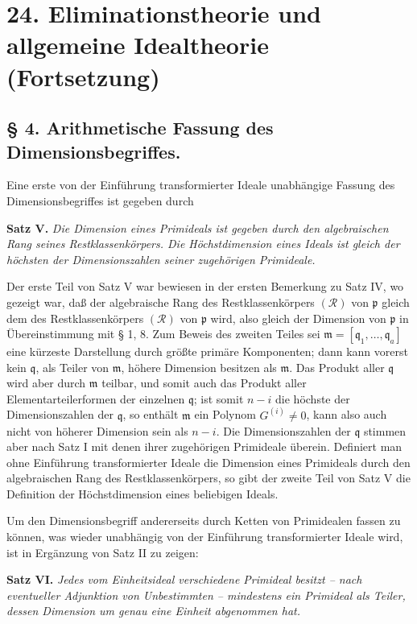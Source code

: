 \documentclass[11pt]{article}
\providecommand{\frakm}{\mathfrak m}
\providecommand{\frakp}{\mathfrak p}
\providecommand{\frakq}{\mathfrak q}
\begin{document}
\section*{24. Eliminationstheorie und allgemeine Idealtheorie (Fortsetzung)}

\subsection*{§ 4. Arithmetische Fassung des Dimensionsbegriffes.}

Eine erste von der Einführung transformierter Ideale unabhängige Fassung des Dimensionsbegriffes ist gegeben durch

\textbf{Satz V.} \emph{Die Dimension eines Primideals ist gegeben durch den algebraischen Rang seines Restklassenkörpers. Die Höchstdimension eines Ideals ist gleich der höchsten der Dimensionszahlen seiner zugehörigen Primideale.}

Der erste Teil von Satz V war bewiesen in der ersten Bemerkung zu Satz IV, wo gezeigt war, daß der algebraische Rang des Restklassenkörpers $(\mathcal R)$ von $\frakp$ gleich dem des Restklassenkörpers $(\mathcal R)$ von $\frakp$ wird, also gleich der Dimension von $\frakp$ in Übereinstimmung mit § 1, 8. Zum Beweis des zweiten Teiles sei $\frakm=[\frakq_1,\ldots,\frakq_a]$ eine kürzeste Darstellung durch größte primäre Komponenten; dann kann vorerst kein $\frakq$, als Teiler von $\frakm$, höhere Dimension besitzen als $\frakm$. Das Produkt aller $\frakq$ wird aber durch $\frakm$ teilbar, und somit auch das Produkt aller Elementarteilerformen der einzelnen $\frakq$; ist somit $n-i$ die höchste der Dimensionszahlen der $\frakq$, so enthält $\frakm$ ein Polynom $G^{(i)}\ne0$, kann also auch nicht von höherer Dimension sein als $n-i$. Die Dimensionszahlen der $\frakq$ stimmen aber nach Satz I mit denen ihrer zugehörigen Primideale überein. Definiert man ohne Einführung transformierter Ideale die Dimension eines Primideals durch den algebraischen Rang des Restklassenkörpers, so gibt der zweite Teil von Satz V die Definition der Höchstdimension eines beliebigen Ideals.

Um den Dimensionsbegriff andererseits durch Ketten von Primidealen fassen zu können, was wieder unabhängig von der Einführung transformierter Ideale wird, ist in Ergänzung von Satz II zu zeigen:

\textbf{Satz VI.} \emph{Jedes vom Einheitsideal verschiedene Primideal besitzt -- nach eventueller Adjunktion von Unbestimmten -- mindestens ein Primideal als Teiler, dessen Dimension um genau eine Einheit abgenommen hat.}
\end{document}
